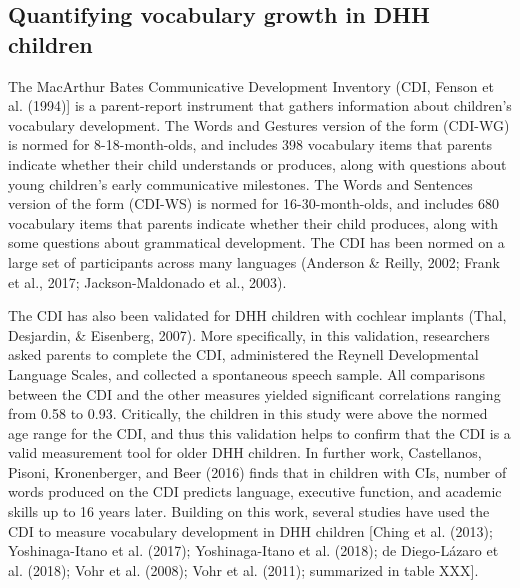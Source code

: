 \documentclass[english,man,floatsintext]{apa6}
\begin{document}
\hypertarget{quantifying-vocabulary-growth-in-dhh-children}{%
\subsection{Quantifying vocabulary growth in DHH children}\label{quantifying-vocabulary-growth-in-dhh-children}}

The MacArthur Bates Communicative Development Inventory (CDI, Fenson et al. (1994){]} is a parent-report instrument that gathers information about children's vocabulary development. The Words and Gestures version of the form (CDI-WG) is normed for 8-18-month-olds, and includes 398 vocabulary items that parents indicate whether their child understands or produces, along with questions about young children's early communicative milestones. The Words and Sentences version of the form (CDI-WS) is normed for 16-30-month-olds, and includes 680 vocabulary items that parents indicate whether their child produces, along with some questions about grammatical development. The CDI has been normed on a large set of participants across many languages (Anderson \& Reilly, 2002; Frank et al., 2017; Jackson-Maldonado et al., 2003).

The CDI has also been validated for DHH children with cochlear implants (Thal, Desjardin, \& Eisenberg, 2007). More specifically, in this validation, researchers asked parents to complete the CDI, administered the Reynell Developmental Language Scales, and collected a spontaneous speech sample. All comparisons between the CDI and the other measures yielded significant correlations ranging from 0.58 to 0.93. Critically, the children in this study were above the normed age range for the CDI, and thus this validation helps to confirm that the CDI is a valid measurement tool for older DHH children. In further work, Castellanos, Pisoni, Kronenberger, and Beer (2016) finds that in children with CIs, number of words produced on the CDI predicts language, executive function, and academic skills up to 16 years later. Building on this work, several studies have used the CDI to measure vocabulary development in DHH children {[}Ching et al. (2013); Yoshinaga-Itano et al. (2017); Yoshinaga-Itano et al. (2018); de Diego-Lázaro et al. (2018); Vohr et al. (2008); Vohr et al. (2011); summarized in table XXX{]}.
\end{document}
